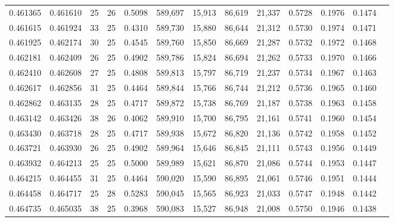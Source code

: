 \begin{tabular}{rrrrrrrrrrrrr}
0.461365 & 0.461610 &    25 &  26 &                                     0.5098 & 589,697 &  15,913 &  86,619 &  21,337 & 0.5728 & 0.1976 & 0.1474 \\
0.461615 & 0.461924 &    33 &  25 &                                     0.4310 & 589,730 &  15,880 &  86,644 &  21,312 & 0.5730 & 0.1974 & 0.1471 \\
0.461925 & 0.462174 &    30 &  25 &                                     0.4545 & 589,760 &  15,850 &  86,669 &  21,287 & 0.5732 & 0.1972 & 0.1468 \\
0.462181 & 0.462409 &    26 &  25 &                                     0.4902 & 589,786 &  15,824 &  86,694 &  21,262 & 0.5733 & 0.1970 & 0.1466 \\
0.462410 & 0.462608 &    27 &  25 &                                     0.4808 & 589,813 &  15,797 &  86,719 &  21,237 & 0.5734 & 0.1967 & 0.1463 \\
0.462617 & 0.462856 &    31 &  25 &                                     0.4464 & 589,844 &  15,766 &  86,744 &  21,212 & 0.5736 & 0.1965 & 0.1460 \\
0.462862 & 0.463135 &    28 &  25 &                                     0.4717 & 589,872 &  15,738 &  86,769 &  21,187 & 0.5738 & 0.1963 & 0.1458 \\
0.463142 & 0.463426 &    38 &  26 &                                     0.4062 & 589,910 &  15,700 &  86,795 &  21,161 & 0.5741 & 0.1960 & 0.1454 \\
0.463430 & 0.463718 &    28 &  25 &                                     0.4717 & 589,938 &  15,672 &  86,820 &  21,136 & 0.5742 & 0.1958 & 0.1452 \\
0.463721 & 0.463930 &    26 &  25 &                                     0.4902 & 589,964 &  15,646 &  86,845 &  21,111 & 0.5743 & 0.1956 & 0.1449 \\
0.463932 & 0.464213 &    25 &  25 &                                     0.5000 & 589,989 &  15,621 &  86,870 &  21,086 & 0.5744 & 0.1953 & 0.1447 \\
0.464215 & 0.464455 &    31 &  25 &                                     0.4464 & 590,020 &  15,590 &  86,895 &  21,061 & 0.5746 & 0.1951 & 0.1444 \\
0.464458 & 0.464717 &    25 &  28 &                                     0.5283 & 590,045 &  15,565 &  86,923 &  21,033 & 0.5747 & 0.1948 & 0.1442 \\
0.464735 & 0.465035 &    38 &  25 &                                     0.3968 & 590,083 &  15,527 &  86,948 &  21,008 & 0.5750 & 0.1946 & 0.1438 \\

\end{tabular}

